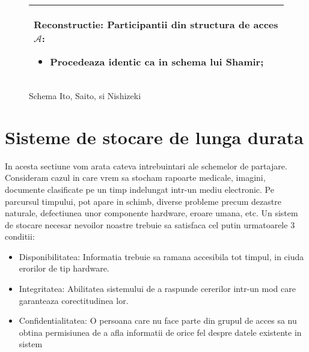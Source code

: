 \documentclass{llncs}
\begin{document}
\begin{figure*}[h!]
\begin{tabular}{|p{\textwidth}|}
\hspace{.1in}
\textbf{Reconstructie}: Participantii din structura de acces $\mathcal{A}$:
	\begin{itemize}
		\item Procedeaza identic ca in schema lui Shamir;
	\end{itemize}


\\
\hline
\end{tabular}

\caption{Schema Ito, Saito, si Nishizeki \cite{ITO:1989}}
\label{fig:ito_et_al}
\end{figure*}




\section{Sisteme de stocare de lunga durata}

In acesta sectiune vom arata cateva intrebuintari ale schemelor de partajare. Consideram cazul in care vrem sa stocham rapoarte medicale, imagini, documente clasificate pe un timp indelungat intr-un mediu electronic. Pe parcursul timpului, pot apare in schimb, diverse probleme precum dezastre naturale, defectiunea unor componente hardware, eroare umana, etc. \cite{SGMV:2009}
Un sistem de stocare necesar nevoilor noastre trebuie sa satisfaca cel putin urmatoarele 3 conditii:
\begin{itemize}
	\item Disponibilitatea: Informatia trebuie sa ramana accesibila tot timpul, in ciuda erorilor de tip hardware.
	\item Integritatea: Abilitatea sistemului de a raspunde cererilor intr-un mod care garanteaza corectitudinea lor.
	\item Confidentialitatea: O persoana care nu face parte din grupul de acces sa nu obtina permisiunea de a afla informatii de orice fel despre datele existente in sistem
\end{itemize}
\end{document}
